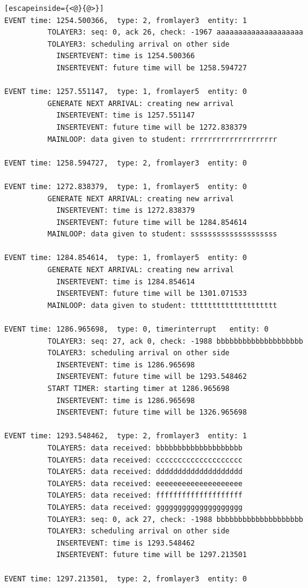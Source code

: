 \documentclass[paper=a4, fontsize=11pt]{scrartcl}
\numberwithin{equation}{section}		%
\numberwithin{figure}{section}			%
\numberwithin{table}{section}				%
\begin{document}
\begin{lstlisting}[escapeinside={<@}{@>}]
EVENT time: 1254.500366,  type: 2, fromlayer3  entity: 1
          TOLAYER3: seq: 0, ack 26, check: -1967 aaaaaaaaaaaaaaaaaaaa
          TOLAYER3: scheduling arrival on other side
            INSERTEVENT: time is 1254.500366
            INSERTEVENT: future time will be 1258.594727

EVENT time: 1257.551147,  type: 1, fromlayer5  entity: 0
          GENERATE NEXT ARRIVAL: creating new arrival
            INSERTEVENT: time is 1257.551147
            INSERTEVENT: future time will be 1272.838379
          MAINLOOP: data given to student: rrrrrrrrrrrrrrrrrrrr

EVENT time: 1258.594727,  type: 2, fromlayer3  entity: 0

EVENT time: 1272.838379,  type: 1, fromlayer5  entity: 0
          GENERATE NEXT ARRIVAL: creating new arrival
            INSERTEVENT: time is 1272.838379
            INSERTEVENT: future time will be 1284.854614
          MAINLOOP: data given to student: ssssssssssssssssssss

EVENT time: 1284.854614,  type: 1, fromlayer5  entity: 0
          GENERATE NEXT ARRIVAL: creating new arrival
            INSERTEVENT: time is 1284.854614
            INSERTEVENT: future time will be 1301.071533
          MAINLOOP: data given to student: tttttttttttttttttttt

EVENT time: 1286.965698,  type: 0, timerinterrupt   entity: 0
          TOLAYER3: seq: 27, ack 0, check: -1988 bbbbbbbbbbbbbbbbbbbb
          TOLAYER3: scheduling arrival on other side
            INSERTEVENT: time is 1286.965698
            INSERTEVENT: future time will be 1293.548462
          START TIMER: starting timer at 1286.965698
            INSERTEVENT: time is 1286.965698
            INSERTEVENT: future time will be 1326.965698

EVENT time: 1293.548462,  type: 2, fromlayer3  entity: 1
          TOLAYER5: data received: bbbbbbbbbbbbbbbbbbbb
          TOLAYER5: data received: cccccccccccccccccccc
          TOLAYER5: data received: dddddddddddddddddddd
          TOLAYER5: data received: eeeeeeeeeeeeeeeeeeee
          TOLAYER5: data received: ffffffffffffffffffff
          TOLAYER5: data received: gggggggggggggggggggg
          TOLAYER3: seq: 0, ack 27, check: -1988 bbbbbbbbbbbbbbbbbbbb
          TOLAYER3: scheduling arrival on other side
            INSERTEVENT: time is 1293.548462
            INSERTEVENT: future time will be 1297.213501

EVENT time: 1297.213501,  type: 2, fromlayer3  entity: 0


\end{lstlisting}
\end{document}
